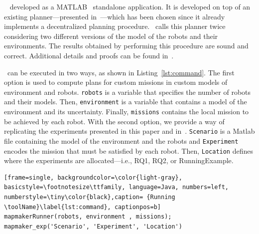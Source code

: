 
\toolName\   developed as a  MATLAB~\cite{matlab} standalone application.
It is developed on top of an existing planner---presented in~\cite{tumova2016multi}---which has been chosen since it already implements a decentralized planning procedure.
\toolName\ calls this planner twice considering two different versions of the model of the robots and their environments. 
The results obtained by performing this procedure are sound and correct.
Additional details and proofs can be found in~\cite{menghi2018multi}.


\toolName\ can be executed in two ways, as shown in Listing~\ref{lst:command}.
The first option is used to compute plans for custom missions in custom models of environment and robots.
\texttt{robots} is a variable that specifies the number of robots and their models.
Then, \texttt{environment} is a variable that contains a model of the environment and its uncertainty.
Finally, \texttt{missions} contains the local mission to be achieved by each robot.
With the second option, we provide a way of replicating the experiments presented in this paper and in~\cite{menghi2018multi}.
\texttt{Scenario} is a Matlab file containing the model of the environment and the robots and \texttt{Experiment} encodes the mission that must be satisfied by each robot.
Then, \texttt{Location} defines where the experiments are allocated---i.e., RQ1, RQ2, or RunningExample.



\begin{lstlisting}[frame=single, backgroundcolor=\color{light-gray}, basicstyle=\footnotesize\ttfamily, language=Java, numbers=left, numberstyle=\tiny\color{black},caption= {Running \toolName}\label{lst:command}, captionpos=b]
mapmakerRunner(robots, environment , missions);
mapmaker_exp('Scenario', 'Experiment', 'Location')
\end{lstlisting}






